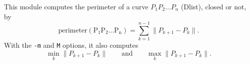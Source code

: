 This module computes the perimeter 
 of a curve $P_1P_2...P_n$ (Dlist),
closed or not, by
$$\mathrm{perimeter(P_1P_2...P_n)} = \sum_{k=1}^{n-1} \|P_{k+1}-P_k\|.$$
With the \verb+-m+ and \verb+M+ options, it also computes
$$\min_k \|P_{k+1}-P_k\| \qquad \mathrm{and} \qquad
\max_k \|P_{k+1}-P_k\|.$$